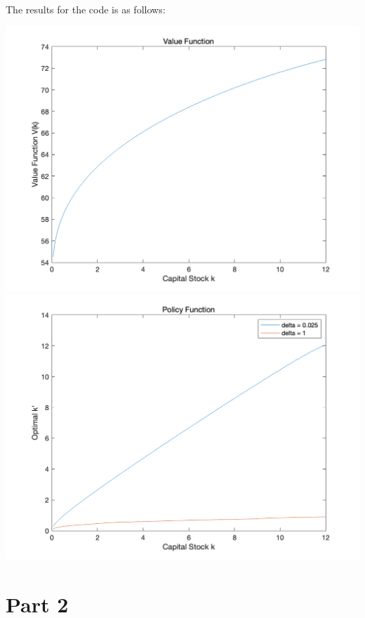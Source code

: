 \documentclass{article}
\begin{document}
The results for the code is as follows:\\
\begin{center}
\includegraphics[scale=0.4]{value_function.png}\\
\includegraphics[scale=0.4]{policy_function.png}
\end{center}


\section{Part 2}

\subsection{}
\end{document}
